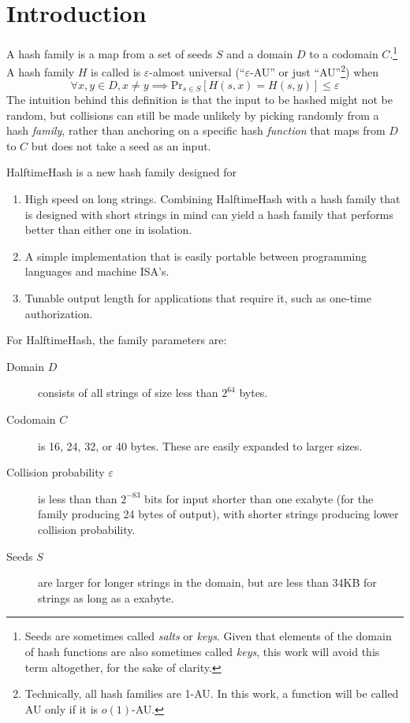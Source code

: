 \documentclass[sigconf, nonacm]{acmart}
\begin{document}
\section{Introduction}
A hash family is a map from a set of seeds $S$ and a domain $D$ to a codomain $C$.\footnote{Seeds are sometimes called {\em salts} or {\em keys}. Given that elements of the domain of hash functions are also sometimes called {\em keys}, this work will avoid this term altogether, for the sake of clarity.}
A hash family $H$ is called is $\varepsilon$-almost universal (``$\varepsilon$-AU'' or just ``AU''\footnote{Technically, all hash families are 1-AU. In this work, a function will be called AU only if it is $o(1)$-AU.}) when
\[\forall x,y \in D, x \neq y \implies \mathrm{Pr}_{s \in S}[H(s, x) = H(s, y)] \leq \varepsilon\]
The intuition behind this definition is that the input to be hashed might not be random, but collisions can still be made unlikely by picking randomly from a hash {\em family}, rather than anchoring on a specific hash {\em function} that maps from $D$ to $C$ but does not take a seed as an input.

HalftimeHash is a new hash family designed for

\begin{enumerate}
\item High speed on long strings.
  Combining HalftimeHash with a hash family that is designed with short strings in mind can yield a hash family that performs better than either one in isolation. \cite{siphash,umash}
\item A simple implementation that is easily portable between programming languages and machine ISA's.
\item Tunable output length for applications that require it, such as one-time authorization. \cite{nacl}
\end{enumerate}

For HalftimeHash, the family parameters are:

\begin{description}
\item[Domain $D$] consists of all strings of size less than $2^{64}$ bytes.
\item[Codomain $C$] is 16, 24, 32, or 40 bytes.
  These are easily expanded to larger sizes.
\item[Collision probability $\varepsilon$] is less than than $2^{-83}$ bits for input shorter than one exabyte (for the family producing 24 bytes of output), with shorter strings producing lower collision probability.
\item[Seeds $S$] are larger for longer strings in the domain, but are less than 34KB for strings as long as a exabyte.
\end{description}
\end{document}

